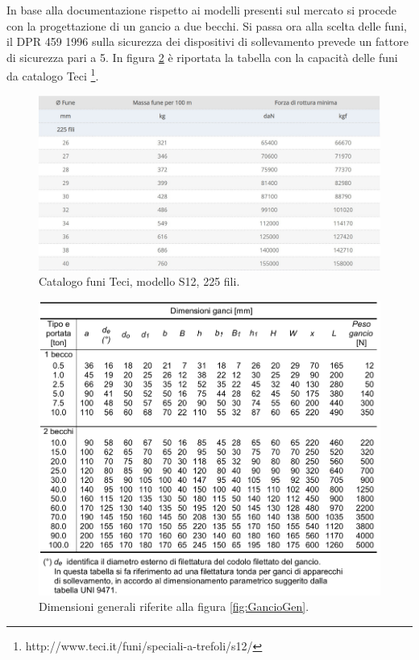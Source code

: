In base alla documentazione rispetto ai modelli presenti sul mercato si procede con la progettazione di un gancio a due becchi.
Si passa ora alla scelta delle funi, il DPR 459 1996 sulla sicurezza dei dispositivi di sollevamento prevede un fattore di sicurezza pari a 5. 
In figura \ref{fig:TabellaFuni} è riportata la tabella con la capacità delle funi da catalogo Teci \footnote{http://www.teci.it/funi/speciali-a-trefoli/s12/}. 
\begin{figure}[H]
\centering
  \includegraphics[width=.65\textwidth]{imgs/TabellaFuni}
\caption{Catalogo funi Teci, modello S12, 225 fili.}
\label{fig:TabellaFuni}
\end{figure}
\begin{figure}[H]
\centering
  \includegraphics[width=.65\textwidth]{imgs/DimGen0}
\caption{Dimensioni generali riferite alla figura \ref{fig:GancioGen}.}
\label{fig:TabellaFuni}
\end{figure}
